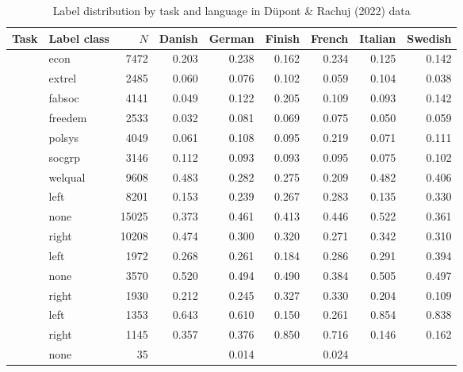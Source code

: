 \begin{table}[!t]

\caption{\label{tab:label_distribution_by_lang_dupont_and_rachuj_2022}Label distribution by task and language in Düpont \& Rachuj (2022) data}
\centering
\fontsize{10}{12}\selectfont
\begin{tabular}[t]{>{\raggedright\arraybackslash}L{1.5in}lrrrrrrr}
\toprule
Task & Label class & $N$ & Danish & German & Finish & French & Italian & Swedish\\
\midrule
 & econ & 7472 & 0.203 & 0.238 & 0.162 & 0.234 & 0.125 & 0.142\\

 & extrel & 2485 & 0.060 & 0.076 & 0.102 & 0.059 & 0.104 & 0.038\\

 & fabsoc & 4141 & 0.049 & 0.122 & 0.205 & 0.109 & 0.093 & 0.142\\

 & freedem & 2533 & 0.032 & 0.081 & 0.069 & 0.075 & 0.050 & 0.059\\

 & polsys & 4049 & 0.061 & 0.108 & 0.095 & 0.219 & 0.071 & 0.111\\

 & socgrp & 3146 & 0.112 & 0.093 & 0.093 & 0.095 & 0.075 & 0.102\\

 & welqual & 9608 & 0.483 & 0.282 & 0.275 & 0.209 & 0.482 & 0.406\\
 & left & 8201 & 0.153 & 0.239 & 0.267 & 0.283 & 0.135 & 0.330\\

 & none & 15025 & 0.373 & 0.461 & 0.413 & 0.446 & 0.522 & 0.361\\

 & right & 10208 & 0.474 & 0.300 & 0.320 & 0.271 & 0.342 & 0.310\\
 & left & 1972 & 0.268 & 0.261 & 0.184 & 0.286 & 0.291 & 0.394\\

 & none & 3570 & 0.520 & 0.494 & 0.490 & 0.384 & 0.505 & 0.497\\

 & right & 1930 & 0.212 & 0.245 & 0.327 & 0.330 & 0.204 & 0.109\\
 & left & 1353 & 0.643 & 0.610 & 0.150 & 0.261 & 0.854 & 0.838\\

 & right & 1145 & 0.357 & 0.376 & 0.850 & 0.716 & 0.146 & 0.162\\

 & none & 35 &  & 0.014 &  & 0.024 &  & \\
\bottomrule
\end{tabular}
\end{table}
